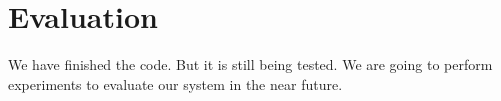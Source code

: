 \section{Evaluation}
\label{eval}

We have finished the code. But it is still being tested. We are going
to perform experiments to evaluate our system in the near future.

